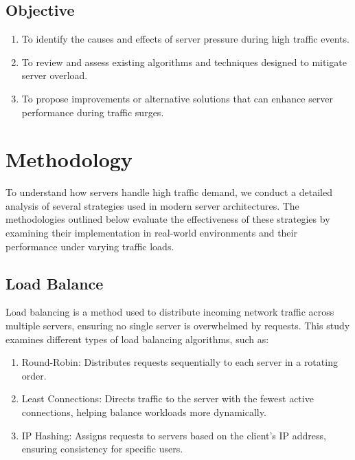 \documentclass{article}
\begin{document}
\subsection{Objective}

\begin{enumerate}

\item To identify the causes and effects of server pressure during high traffic events.
\item To review and assess existing algorithms and techniques designed to mitigate server overload.
\item To propose improvements or alternative solutions that can enhance server performance during traffic surges.


\end{enumerate}

\section{Methodology}
To understand how servers handle high traffic demand, we conduct a detailed analysis of several strategies used in modern server architectures. The methodologies outlined below evaluate the effectiveness of these strategies by examining their implementation in real-world environments and their performance under varying traffic loads.

\subsection{Load Balance}

Load balancing is a method used to distribute incoming network traffic across multiple servers, ensuring no single server is overwhelmed by requests. This study examines different types of load balancing algorithms, such as:

\begin{enumerate}
    \item Round-Robin: Distributes requests sequentially to each server in a rotating order.

    \item Least Connections: Directs traffic to the server with the fewest active connections, helping balance workloads more dynamically.

    \item IP Hashing: Assigns requests to servers based on the client's IP address, ensuring consistency for specific users.
\end{enumerate}
\end{document}
